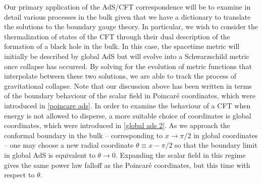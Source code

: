 \documentclass[../PhD.tex]{subfiles}
\begin{document}
Our primary application of the AdS/CFT correspondence will be to examine in detail various processes in the bulk given that we have a dictionary to translate the solutions to the boundary gauge theory. In particular, we wish to consider the thermalization of states of the CFT through their dual description of the formation of a black hole in the bulk. In this case, the spacetime metric will initially be described by global AdS but will evolve into a Schwarzschild metric once collapse has occurred. By solving for the evolution of metric functions that interpolate between these two solutions, we are able to track the process of gravitational collapse. Note that our discussion above has been written in terms of the boundary behaviour of the scalar field in Poincar\'e coordinates, which were introduced in \eqref{poincare ads}. In order to examine the behaviour of a CFT when energy is not allowed to disperse, a more suitable choice of coordinates is global coordinates, which were introduced in \eqref{global ads 2}. As we approach the conformal boundary in the bulk -- corresponding to $x \to \pi/2$ in global coordinates -- one may choose a new radial coordinate $\theta \equiv x - \pi/2$ so that the boundary limit in global AdS is equivalent to $\theta \to 0$. Expanding the scalar field in this regime gives the same power law falloff as the Poincar\'e coordinates, but this time with respect to $\theta$.
\end{document}
